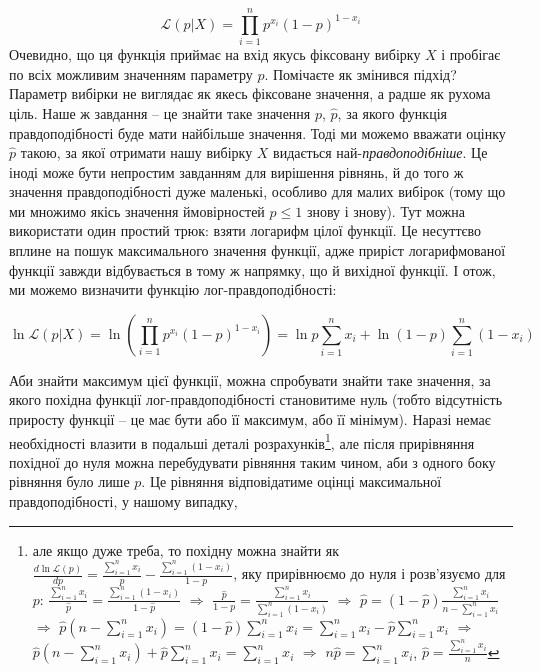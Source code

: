 \documentclass[
  11pt,
]{book}
\begin{document}
\[\mathcal{L}(p|X) = \prod \limits_{i = 1}^n p^{x_i} (1 - p)^{1-x_i}\]
Очевидно, що ця функція приймає на вхід якусь фіксовану вибірку \(X\) і пробігає по всіх можливим значенням параметру \(p\). Помічаєте як змінився підхід? Параметр вибірки не виглядає як якесь фіксоване значення, а радше як рухома ціль. Наше ж завдання -- це знайти таке значення \(p\), \(\hat{p}\), за якого функція правдоподібності буде мати найбільше значення. Тоді ми можемо вважати оцінку \(\hat{p}\) такою, за якої отримати нашу вибірку \(X\) видається най-\emph{правдоподібніше}. Це іноді може бути непростим завданням для вирішення рівнянь, й до того ж значення правдоподібності дуже маленькі, особливо для малих вибірок (тому що ми множимо якісь значення ймовірностей \(p \leq 1\) знову і знову). Тут можна використати один простий трюк: взяти логарифм цілої функції. Це несуттєво вплине на пошук максимального значення функції, адже приріст логарифмованої функції завжди відбувається в тому ж напрямку, що й вихідної функції. І отож, ми можемо визначити функцію лог-правдоподібності:

\[\ln \mathcal{L}(p|X) = \ln \left( \prod \limits_{i = 1}^n p^{x_i} (1 - p)^{1-x_i} \right) = \ln p \sum \limits_{i=1}^n x_i + \ln (1-p) \sum \limits_{i=1}^n (1 - x_i)\]

Аби знайти максимум цієї функції, можна спробувати знайти таке значення, за якого похідна функції лог-правдоподібності становитиме нуль (тобто відсутність приросту функції -- це має бути або її максимум, або її мінімум). Наразі немає необхідності влазити в подальші деталі розрахунків\footnote{але якщо дуже треба, то похідну можна знайти як \(\frac{d \ln \mathcal{L} (p)}{d p} = \frac{\sum_{i=1}^n x_i}{p} - \frac{\sum_{i=1}^n (1 - x_i)}{1-p}\), яку прирівнюємо до нуля і розв'язуємо для \(p\): \(\frac{\sum_{i=1}^n x_i}{\hat{p}} = \frac{\sum_{i=1}^n (1 - x_i)}{1-\hat{p}}\) \(\Rightarrow\) \(\frac{\hat{p}}{1 - p} = \frac{\sum_{i=1}^n x_i}{\sum_{i=1}^n (1 - x_i)}\) \(\Rightarrow\) \(\hat{p} = (1 - \hat{p}) \frac{\sum_{i=1}^n x_i}{n - \sum_{i=1}^n x_i}\) \(\Rightarrow\) \(\hat{p} (n - \sum_{i=1}^n x_i) = (1 - \hat{p}) \sum_{i=1}^n x_i = \sum_{i=1}^n x_i - \hat{p} \sum_{i=1}^n x_i\) \(\Rightarrow\) \(\hat{p} (n - \sum_{i=1}^n x_i) + \hat{p} \sum_{i=1}^n x_i = \sum_{i=1}^n x_i\) \(\Rightarrow\) \(n\hat{p} = \sum_{i=1}^n x_i\), \(\hat{p} = \frac{\sum_{i=1}^n x_i}{n}\)}, але після прирівняння похідної до нуля можна перебудувати рівняння таким чином, аби з одного боку рівняння було лише \(p\). Це рівняння відповідатиме оцінці максимальної правдоподібності, у нашому випадку,
\end{document}
